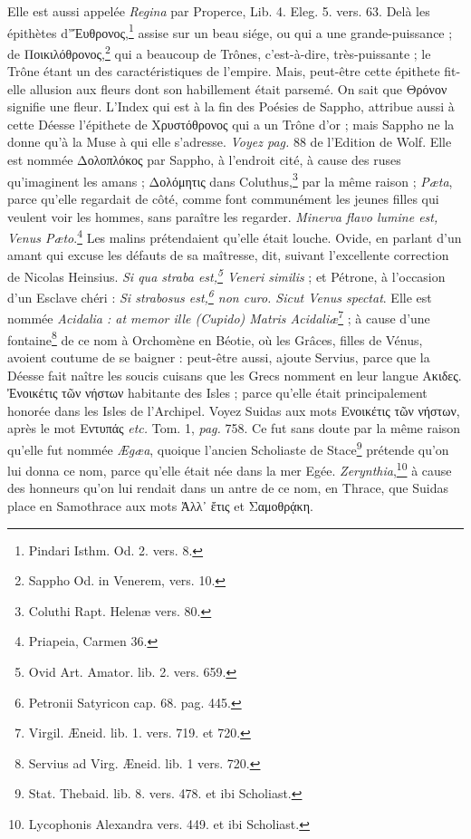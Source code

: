 \documentclass[a4paper, 18pt, oneside]{article}
\begin{document}
Elle est aussi appelée \emph{Regina} par Properce, Lib. 4. Eleg. 5. vers. 63. Delà les épithètes d'Ἔυθρονος,\footnote{Pindari Isthm. Od. 2. vers. 8.} assise sur un beau siége, ou qui a une grande-puissance ; de Ποικιλόθρονος,\footnote{Sappho Od. in Venerem, vers. 10.} qui a beaucoup de Trônes, c'est-à-dire, très-puissante ; le Trône étant un des caractéristiques de l'empire. Mais, peut-être cette épithete fit-elle allusion aux fleurs dont son habillement était parsemé. On sait que Θρόνον signifie une fleur. L'Index qui est à la fin des Poésies de Sappho, attribue aussi à cette Déesse l'épithete de Χρυστόθρονος qui a un Trône d'or ; mais Sappho ne la donne qu'à la Muse à qui elle s'adresse. \emph{Voyez pag.} 88 de l'Edition de Wolf. Elle est nommée Δολοπλόκος par Sappho, à l'endroit cité, à cause des ruses qu'imaginent les amans ; Δολόμητις dans Coluthus,\footnote{Coluthi Rapt. Helenæ vers. 80.} par la même raison ; \emph{Pæta}, parce qu'elle regardait de côté, comme font communément les jeunes filles qui veulent voir les hommes, sans paraître les regarder. \emph{Minerva flavo lumine est, Venus Pæto}.\footnote{Priapeia, Carmen 36.} Les malins prétendaient qu'elle était louche. Ovide, en parlant d'un amant qui excuse les défauts de sa maîtresse, dit, suivant l'excellente correction de Nicolas Heinsius. \emph{Si qua straba est,\footnote{Ovid Art. Amator. lib. 2. vers. 659.} Veneri similis} ; et Pétrone, à l'occasion d'un Esclave chéri : \emph{Si strabosus est,\footnote{Petronii Satyricon cap. 68. pag. 445.} non curo. Sicut Venus spectat}. Elle est nommée \emph{Acidalia : at memor ille (Cupido) Matris Acidaliæ}\footnote{Virgil. Æneid. lib. 1. vers. 719. et 720.} ; à cause d'une fontaine\footnote{Servius ad Virg. Æneid. lib. 1 vers. 720.} de ce nom à Orchomène en Béotie, où les Grâces, filles de Vénus, avoient coutume de se baigner : peut-être aussi, ajoute Servius, parce que la Déesse fait naître les soucis cuisans que les Grecs nomment en leur langue Ακιδες. Ἐνοικέτις τῶν νήστων habitante des Isles ; parce qu'elle était principalement honorée dans les Isles de l'Archipel. Voyez Suidas aux mots Ενοικέτις τῶν νήστων, après le mot Εντυπάς \emph{etc.} Tom. 1, \emph{pag.} 758. Ce fut sans doute par la même raison qu'elle fut nommée \emph{Ægæa}, quoique l'ancien Scholiaste de Stace\footnote{Stat. Thebaid. lib. 8. vers. 478. et ibi Scholiast.} prétende qu'on lui donna ce nom, parce qu'elle était née dans la mer Egée. \emph{Zerynthia},\footnote{Lycophonis Alexandra vers. 449. et ibi Scholiast.} à cause des honneurs qu'on lui rendait dans un antre de ce nom, en Thrace, que Suidas place en Samothrace aux mots Ἀλλ᾽ ἔτις et Σαμοθρᾴκη.
\end{document}
